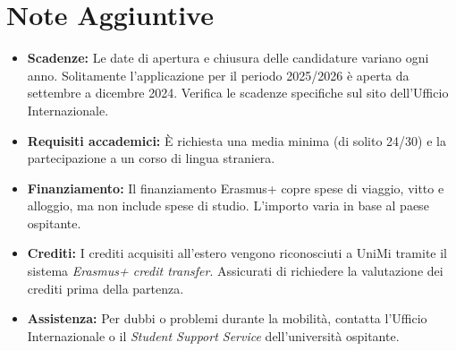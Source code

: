 \documentclass{article}
\begin{document}
\section{Note Aggiuntive}
\begin{itemize}
    \item \textbf{Scadenze:} Le date di apertura e chiusura delle candidature variano ogni anno.  Solitamente l'applicazione per il periodo 2025/2026 è aperta da settembre a dicembre 2024.  Verifica le scadenze specifiche sul sito dell'Ufficio Internazionale.  
    \item \textbf{Requisiti accademici:} È richiesta una media minima (di solito 24/30) e la partecipazione a un corso di lingua straniera.  
    \item \textbf{Finanziamento:} Il finanziamento Erasmus+ copre spese di viaggio, vitto e alloggio, ma non include spese di studio.  L'importo varia in base al paese ospitante.  
    \item \textbf{Crediti:} I crediti acquisiti all'estero vengono riconosciuti a UniMi tramite il sistema \textit{Erasmus+ credit transfer}.  Assicurati di richiedere la valutazione dei crediti prima della partenza.  
    \item \textbf{Assistenza:} Per dubbi o problemi durante la mobilità, contatta l'Ufficio Internazionale o il \textit{Student Support Service} dell'università ospitante.  
\end{itemize}
\end{document}
